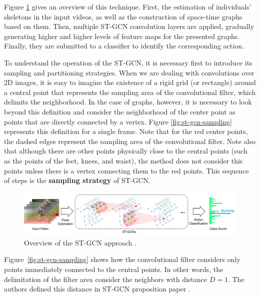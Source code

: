 Figure \ref{fig:st-gcn-workflow} gives an overview of this technique. First, the estimation of individuals' skeletons in the input videos, as well as the construction of space-time graphs based on them. Then, multiple ST-GCN convolution layers are applied, gradually generating higher and higher levels of feature maps for the presented graphs. Finally, they are submitted to a classifier to identify the corresponding action.

To understand the operation of the ST-GCN, it is necessary first to introduce its sampling and partitioning strategies. When we are dealing with convolutions over 2D images, it is easy to imagine the existence of a rigid grid (or rectangle) around a central point that represents the sampling area of the convolutional filter, which delimits the neighborhood. In the case of graphs, however, it is necessary to look beyond this definition and consider the neighborhood of the center point as points that are directly connected by a vertex. Figure \ref{fig:st-gcn-sampling} represents this definition for a single frame. Note that for the red center points, the dashed edges represent the sampling area of the convolutional filter. Note also that although there are other points physically close to the central points (such as the points of the feet, knees, and waist), the method does not consider this points unless there is a vertex connecting them to the red points. This sequence of steps is the \textbf{sampling strategy} of ST-GCN. \\[-8mm]



\begin{figure}[!ht]
    \centering
    \includegraphics[width=1.0\textwidth]{images/st_gcn_workflow}
    \caption{Overview of the ST-GCN approach \cite[p. 3]{st-gcn-2018}.}
    \label{fig:st-gcn-workflow}
\end{figure}

\vspace{-5mm}

Figure~\ref{fig:st-gcn-sampling} shows how the convolutional filter considers only points immediately connected to the central points. In other words, the delimitation of the filter area consider the neighbors with distance $D = 1$. The authors defined this distance in ST-GCN proposition paper \cite{st-gcn-2018}. 

